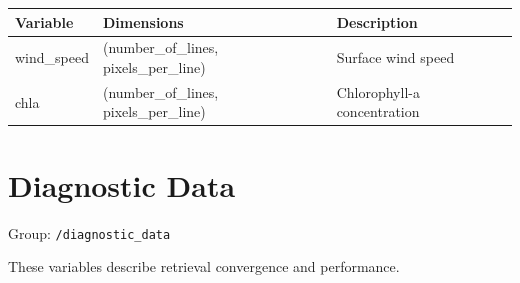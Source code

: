 \documentclass[
  letterpaper,
]{scrbook}
\begin{document}
\begin{longtable}[]{@{}
  >{\raggedright\arraybackslash}p{}
  >{\raggedright\arraybackslash}p{}
  >{\raggedright\arraybackslash}p{}@{}}
\toprule\noalign{}
\begin{minipage}[b]{\linewidth}\raggedright
Variable
\end{minipage} & \begin{minipage}[b]{\linewidth}\raggedright
Dimensions
\end{minipage} & \begin{minipage}[b]{\linewidth}\raggedright
Description
\end{minipage} \\
\midrule\noalign{}
\endhead
\bottomrule\noalign{}
\endlastfoot
wind\_speed & (number\_of\_lines, pixels\_per\_line) & Surface wind
speed \\
chla & (number\_of\_lines, pixels\_per\_line) & Chlorophyll-a
concentration \\
\end{longtable}

\section{Diagnostic Data}\label{diagnostic-data}

Group: \texttt{/diagnostic\_data}

These variables describe retrieval convergence and performance.
\end{document}
